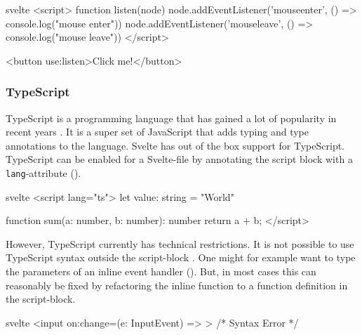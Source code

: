 \begin{listing}[H]
\begin{myminted}{svelte}{}
<script>
  function listen(node) {
    node.addEventListener('mouseenter', () => console.log("mouse enter"))
    node.addEventListener('mouseleave', () => console.log("mouse leave"))
  }
</script>

<button use:listen>Click me!</button>
\end{myminted}
\caption{Example usage of actions to register an event listener.}
\label{fig:svelte-use-directive}
\end{listing}


\subsubsection{TypeScript}
TypeScript is a programming language that has gained a lot of popularity in recent years \cite{noauthor_stack_nodate}. It is a super set of JavaScript that adds typing and type annotations to the language. Svelte has out of the box support for TypeScript. TypeScript can be enabled for a Svelte-file by annotating the script block with a \texttt{lang}-attribute (). 
\begin{listing}[H]
\begin{myminted}{svelte}{}
<script lang="ts">
  let value: string = "World"

  function sum(a: number, b: number): number {
    return a + b;
  }
</script>
\end{myminted}
\caption{Svelte-file that uses TypeScript.}
\label{fig:svelte-ts-usage}
\end{listing}

However, TypeScript currently has technical restrictions. It is not possible to use TypeScript syntax outside the script-block \cite{noauthor_proposal_nodate}. One might for example want to type the parameters of an inline event handler (). But, in most cases this can reasonably be fixed by refactoring the inline function to a function definition in the script-block.
\begin{listing}[H]
\begin{myminted}{svelte}{}
<input on:change={(e: InputEvent) => {}}> /* Syntax Error */
\end{myminted}
\caption{TypeScript-syntax in inline functions is currently possible.}
\label{fig:svelte-ts-inline-error}
\end{listing}

